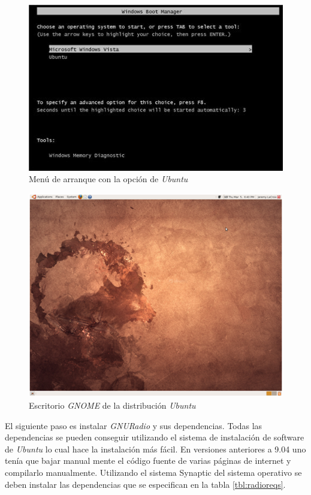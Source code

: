 \begin{figure}[htp]
\centering
	\includegraphics[scale=0.8]{figs/boot}
	\caption{Men\'u de arranque con la opci\'on de \emph{Ubuntu}}
	\label{fig:bootmenu}
\end{figure}

\begin{figure}[htp]
\centering
	\includegraphics[scale=0.7]{figs/desk}
	\caption{Escritorio \emph{GNOME} de la distribuci\'on \emph{Ubuntu}}
	\label{fig:desktop}
\end{figure}

El siguiente paso es instalar \emph{GNURadio} y sus dependencias. Todas
las dependencias se pueden conseguir utilizando el sistema de instalaci\'on de
software de \emph{Ubuntu} lo cual hace la instalaci\'on m\'as f\'acil. En
versiones anteriores a 9.04 uno ten\'ia que bajar manual mente el c\'odigo
fuente de varias p\'aginas de internet y compilarlo manualmente. Utilizando el
sistema Synaptic del sistema operativo se deben instalar las dependencias que se
especifican en la tabla \ref{tbl:radioreqs}.

